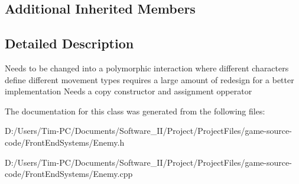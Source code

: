 \subsection*{Additional Inherited Members}


\subsection{Detailed Description}
Needs to be changed into a polymorphic interaction where different characters define different movement types requires a large amount of redesign for a better implementation Needs a copy constructor and assignment opperator 

The documentation for this class was generated from the following files\+:\begin{DoxyCompactItemize}
\item 
D\+:/\+Users/\+Tim-\/\+P\+C/\+Documents/\+Software\+\_\+\+I\+I/\+Project/\+Project\+Files/game-\/source-\/code/\+Front\+End\+Systems/Enemy.\+h\item 
D\+:/\+Users/\+Tim-\/\+P\+C/\+Documents/\+Software\+\_\+\+I\+I/\+Project/\+Project\+Files/game-\/source-\/code/\+Front\+End\+Systems/Enemy.\+cpp\end{DoxyCompactItemize}
